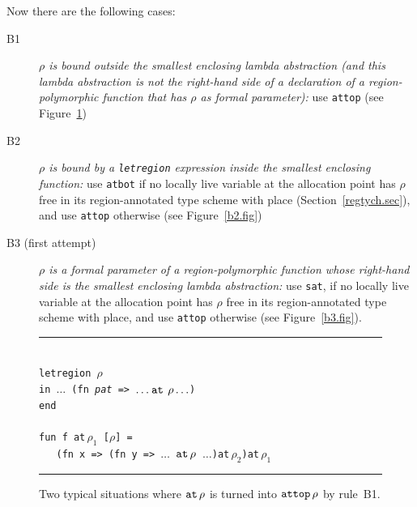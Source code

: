 \documentclass[12pt]{book}
\begin{document}
Now there are the following cases:
\begin{description}
\item[B1] {\it $\rho$ is bound outside the smallest enclosing lambda
    abstraction (and this lambda abstraction is not the right-hand
    side of a declaration of a region-polymorphic function that has
    $\rho$ as formal parameter):} use {\tt attop}
    (see Figure~\ref{b1.fig})
  \item[B2] {\it $\rho$ is bound by a {\tt letregion} expression
      inside the smallest enclosing function:} use {\tt atbot} if no
    locally live variable at the allocation point has $\rho$ free in
    its region-annotated type scheme with place
    (Section~\ref{regtych.sec}), and use {\tt attop} otherwise 
    (see Figure~\ref{b2.fig})
  \item[B3 (first attempt)]{\it $\rho$ is a formal parameter of a
      region-polymorphic function whose right-hand side is the
      smallest enclosing lambda abstraction:} use
    {\tt sat}, if no locally live variable at the allocation point has
    $\rho$ free in its region-annotated type scheme with place, and
    use {\tt attop} otherwise (see Figure~\ref{b3.fig}).
\end{description}
\begin{figure}[htb]
\hrule
\begin{center}
\begin{tabbing}
\\
\hskip3cm\=\tt letregion $\rho$\\
       \>\tt in $\ldots$ (fn {\it pat} => $\ldots\mathbin{\hbox{\tt at}}\,\rho\ldots$)\\
       \>\tt end\\
\\
       \>\tt fun f at$\,\rho_1$ [$\rho$] =\\
       \>\tt\ \ \ (fn x => (fn y => $\ldots$ $\mathbin{\hbox{\tt at}}\,\rho$ $\ldots$)at$\,\rho_2$)at$\,\rho_1$\\
\end{tabbing}
\end{center}
\caption{Two typical situations where $\mathbin{\hbox{\tt at}}\,\rho$ is turned into $\hbox{\tt attop}\,\rho$
  by
  rule~B1.} \medskip \hrule
\label{b1.fig}
\end{figure}
\end{document}
